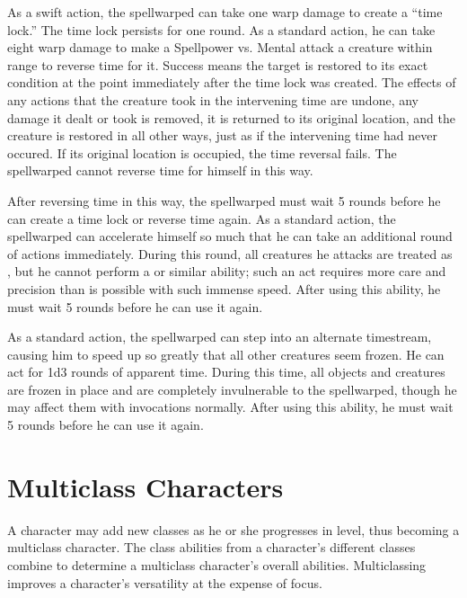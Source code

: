             As a swift action, the spellwarped can take one warp damage to create a ``time lock.'' The time lock persists for one round.
            As a standard action, he can take eight warp damage to make a Spellpower vs. Mental attack a creature within \rngmed range to reverse time for it.
            Success means the target is restored to its exact condition at the point immediately after the time lock was created.
            The effects of any actions that the creature took in the intervening time are undone, any damage it dealt or took is removed, it is returned to its original location, and the creature is restored in all other ways, just as if the intervening time had never occured.
            If its original location is occupied, the time reversal fails.
            The spellwarped cannot reverse time for himself in this way.
            \par After reversing time in this way, the spellwarped must wait 5 rounds before he can create a time lock or reverse time again.
            As a standard action, the spellwarped can accelerate himself so much that he can take an additional round of actions immediately.
            During this round, all creatures he attacks are treated as \helpless, but he cannot perform a  or similar ability; such an act requires more care and precision than is possible with such immense speed.
            After using this ability, he must wait 5 rounds before he can use it again.

            As a standard action, the spellwarped can step into an alternate timestream, causing him to speed up so greatly that all other creatures seem frozen.
            He can act for 1d3 rounds of apparent time.
            During this time, all objects and creatures are frozen in place and are completely invulnerable to the spellwarped, though he may affect them with invocations normally.
            After using this ability, he must wait 5 rounds before he can use it again.

\section{Multiclass Characters}\label{Multiclass Characters}
    A character may add new classes as he or she progresses in level, thus becoming a multiclass character.
    The class abilities from a character's different classes combine to determine a multiclass character's overall abilities.
    Multiclassing improves a character's versatility at the expense of focus.

